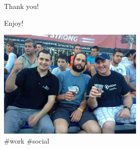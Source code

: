 \documentclass{beamer}
\begin{document}
%
%
%
%
%      
%
%
%
%
%
%
%

\begin{frame}{}{}
  \begin{center}
      Thank you!
  \end{center}
\end{frame}

\begin{frame}{Enjoy!}{}
  \begin{center}
      \includegraphics[height=200px]{imgs/enjoy.jpg}\\
      \#work \#social
  \end{center}
\end{frame}
\end{document}
